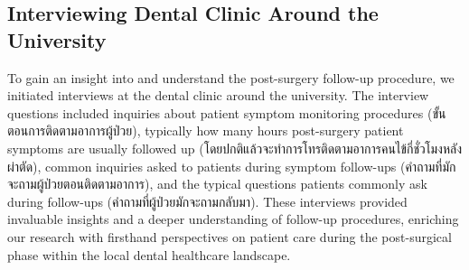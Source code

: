 \documentclass[12pt,oneside,openright,a4paper]{cpe-english-project}
\begin{document}
    \subsection{Interviewing Dental Clinic Around the University}
      \qquad To gain an insight into and understand the post-surgery follow-up procedure, we initiated interviews at the dental clinic around the university. The interview questions included inquiries about patient symptom monitoring procedures (\textthai{ขั้นตอนการติดตามอาการผู้ป่วย}), typically how many hours post-surgery patient symptoms are usually followed up (\textthai{โดยปกติแล้วจะทำการโทรติดตามอาการคนไข้กี่ชั่วโมงหลังผ่าตัด}), common inquiries asked to patients during symptom follow-ups (\textthai{คำถามที่มักจะถามผู้ป่วยตอนติดตามอาการ}), and the typical questions patients commonly ask during follow-ups (\textthai{คำถามที่ผู้ป่วยมักจะถามกลับมา}). These interviews provided invaluable insights and a deeper understanding of follow-up procedures, enriching our research with firsthand perspectives on patient care during the post-surgical phase within the local dental healthcare landscape. \par
\end{document}
